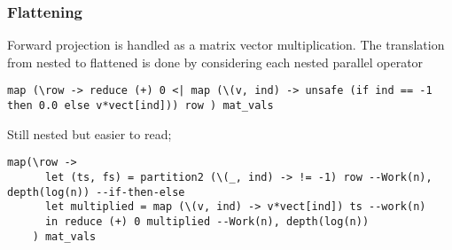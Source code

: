 \documentclass{beamer}
\begin{document}
\begin{frame}[fragile]
  \frametitle{Flattening}
  Forward projection is handled as a matrix vector multiplication. The translation from nested to flattened is done by considering each nested parallel operator%
  \begin{lstlisting}[frame=single, language=Futhark]
    map (\row -> reduce (+) 0 <| map (\(v, ind) -> unsafe (if ind == -1 then 0.0 else v*vect[ind])) row ) mat_vals
  \end{lstlisting}
  Still nested but easier to read;
  \begin{lstlisting}[frame=single, language=Futhark]
    map(\row ->
      let (ts, fs) = partition2 (\(_, ind) -> != -1) row --Work(n), depth(log(n)) --if-then-else
      let multiplied = map (\(v, ind) -> v*vect[ind]) ts --work(n)
      in reduce (+) 0 multiplied --Work(n), depth(log(n))
    ) mat_vals
  \end{lstlisting}
\end{frame}
%
%
\end{document}
